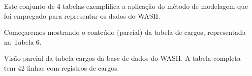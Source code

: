 \documentclass[
12pt,		%
openright,	%
twoside,  %
a4paper,			%
chapter=TITLE,		%
english,			%
french,				%
spanish,			%
brazil				%
]{USPSC-classe/USPSC}
\begin{document}
Este conjunto de 4 tabelas exemplifica a aplica\c{c}\~ao do m\'etodo de modelagem que foi empregado para representar os dados do WASH.








Come\c{c}aremos mostrando o conte\'udo (parcial) da tabela de \textquotedbl cargos\textquotedbl , representada na Tabela 6.












\begin{table}[htb]
\tiny
\caption{\label{471c2ffdec00a12cab7b8ade7a5c86a4223d3c63}Vis\~ao parcial da tabela cargos da base de dados do WASH. A tabela completa tem 42 linhas com registros de cargos.}


\end{table}
\end{document}
